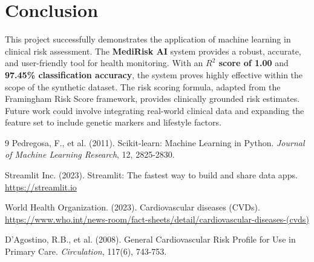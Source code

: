 \documentclass[12pt, a4paper]{article}
\begin{document}
\section{Conclusion}
This project successfully demonstrates the application of machine learning in clinical risk assessment. The \textbf{MediRisk AI} system provides a robust, accurate, and user-friendly tool for health monitoring. With an \textbf{$R^2$ score of 1.00} and \textbf{97.45\% classification accuracy}, the system proves highly effective within the scope of the synthetic dataset. The risk scoring formula, adapted from the Framingham Risk Score framework, provides clinically grounded risk estimates. Future work could involve integrating real-world clinical data and expanding the feature set to include genetic markers and lifestyle factors.

\begin{thebibliography}{9}
Pedregosa, F., et al. (2011). Scikit-learn: Machine Learning in Python. \textit{Journal of Machine Learning Research}, 12, 2825-2830.

Streamlit Inc. (2023). Streamlit: The fastest way to build and share data apps. \url{https://streamlit.io}

World Health Organization. (2023). Cardiovascular diseases (CVDs). \url{https://www.who.int/news-room/fact-sheets/detail/cardiovascular-diseases-(cvds)}

D'Agostino, R.B., et al. (2008). General Cardiovascular Risk Profile for Use in Primary Care. \textit{Circulation}, 117(6), 743-753.
\end{thebibliography}
\end{document}
